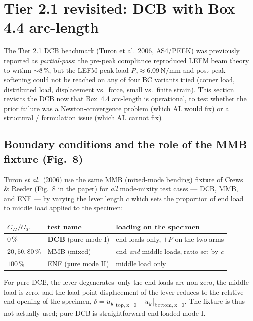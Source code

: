 \section{Tier 2.1 revisited: DCB with Box 4.4 arc-length}
\label{sec:dcb_arclength}

The Tier 2.1 DCB benchmark (Turon et al.\ 2006, AS4/PEEK) was previously
reported as \emph{partial-pass}: the pre-peak compliance reproduced LEFM
beam theory to within $\sim 8\,\%$, but the LEFM peak load
$P_c \approx 6.09~\text{N/mm}$ and post-peak softening could not be
reached on any of four BC variants tried (corner load, distributed load,
displacement vs.\ force, small vs.\ finite strain). This section revisits
the DCB now that Box~4.4 arc-length is operational, to test whether the
prior failure was a Newton-convergence problem (which AL would fix) or a
structural / formulation issue (which AL cannot fix).

\subsection{Boundary conditions and the role of the MMB fixture (Fig.~8)}

Turon \emph{et al.}~(2006) use the same MMB (mixed-mode bending) fixture
of Crews \& Reeder (Fig.~8 in the paper) for \emph{all} mode-mixity test
cases — DCB, MMB, and ENF — by varying the lever length $c$ which sets
the proportion of end load to middle load applied to the specimen:

\begin{table}[h]
\centering
\small
\begin{tabular}{lll}
\toprule
$G_{II}/G_T$ & test name & loading on the specimen \\
\midrule
$0\,\%$         & \textbf{DCB} (pure mode I)  & end loads only, $\pm P$ on the two arms \\
$20, 50, 80\,\%$ & MMB (mixed)                & end \emph{and} middle loads, ratio set by $c$ \\
$100\,\%$       & ENF (pure mode II)         & middle load only \\
\bottomrule
\end{tabular}
\end{table}

For pure DCB, the lever degenerates: only the end loads are non-zero,
the middle load is zero, and the load-point displacement of the lever
reduces to the relative end opening of the specimen,
$\delta = u_y\big|_{\rm top,\,x=0} - u_y\big|_{\rm bottom,\,x=0}$.
The fixture is thus not actually used; pure DCB is straightforward
end-loaded mode I.

